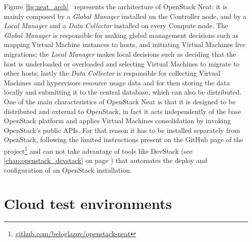 Figure \ref{fig:neat_arch}~\cite[p.~7]{beloglazov2014openstack} represents the architecture of OpenStack Neat: it is mainly composed by a \textit{Global Manager} installed on the Controller node, and by a \textit{Local Manager} and a \textit{Data Collector} installed on every Compute node. The \textit{Global Manager} is responsible for making global management decisions such as mapping Virtual Machine instances to hosts, and initiating Virtual Machines live migrations; the \textit{Local Manager} makes local decisions such as deciding that the host is underloaded or overloaded and selecting Virtual Machines to migrate to other hosts; lastly the \textit{Data Collector} is responsible for collecting Virtual Machines and hypervisors resource usage data and for then storing the data locally and submitting it to the central database, which can also be distributed.\\
One of the main characteristics of OpenStack Neat is that it is designed to be distributed and external to OpenStack, in fact it acts independently of the base OpenStack platform and applies Virtual Machines consolidation by invoking OpenStack's public APIs. For that reason it has to be installed separately from OpenStack, following the limited instructions present on the GitHub page of the project\footnote{\url{github.com/beloglazov/openstack-neat}} and can not take advantage of tools like DevStack (see \ref{chap:openstack_devstack} on page \pageref{chap:openstack_devstack}) that automates the deploy and configuration of an OpenStack installation. \\



\section{Cloud test environments}
\label{sec:sota_test_env}

